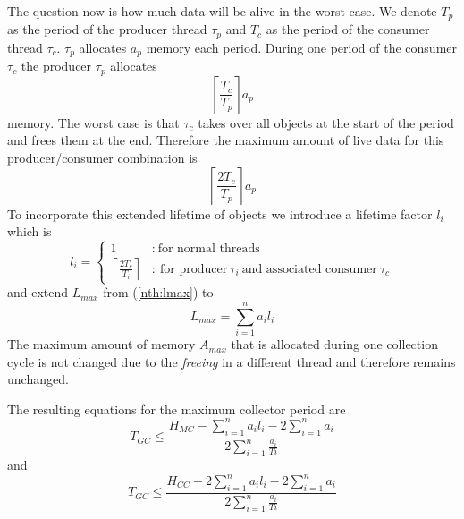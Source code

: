 The question now is how much data will be alive in the worst case.
We denote $T_p$ as the period of the producer thread $\tau_p$ and
$T_c$ as the period of the consumer thread $\tau_c$. $\tau_p$
allocates $a_p$ memory each period. During one period of the
consumer $\tau_c$ the producer $\tau_p$ allocates
\begin{equation*}
    \left\lceil\frac{T_c}{T_p}\right\rceil a_p
\end{equation*}
memory. The worst case is that $\tau_c$ takes over all objects at
the start of the period and frees them at the end. Therefore the
maximum amount of live data for this producer/consumer combination
is
\begin{equation*}
    \left\lceil\frac{2 T_c}{T_p}\right\rceil a_p
\end{equation*}
To incorporate this extended lifetime of objects we introduce a
lifetime factor $l_i$ which is
\begin{equation}\label{equ:liv:fac}
    l_i = \left\{
    \begin{array}{ll}
    1 & :\ \mbox{for normal threads}\\
    \left\lceil\frac{2 T_c}{T_i}\right\rceil & :
    \ \mbox{for producer}\ \tau_i\ \mbox{and associated consumer}\ \tau_c
    \end{array}
    \right.
\end{equation}
and extend $L_{max}$ from (\ref{nth:lmax}) to
\begin{equation}
    L_{max} = \sum_{i=1}^{n} a_i l_i
\end{equation}
The maximum amount of memory $A_{max}$ that is allocated during one
collection cycle is not changed due to the \emph{freeing} in a
different thread and therefore remains unchanged.

The resulting equations for the maximum collector period are
\begin{equation}
    T_{GC} \le \frac{H_{MC}-\sum_{i=1}^{n} a_i l_i - 2\sum_{i=1}^{n} a_i}{2\sum_{i=1}^{n} \frac{a_i}{Ti}}
\end{equation}
and
\begin{equation}
    T_{GC} \le \frac{H_{CC}-2\sum_{i=1}^{n} a_i l_i - 2\sum_{i=1}^{n} a_i}{2\sum_{i=1}^{n}
    \frac{a_i}{Ti}}
\end{equation}




%



